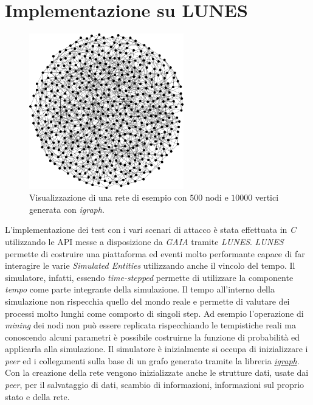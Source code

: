 \chapter{Implementazione su LUNES}

\begin{figure}[H]
    \centering
    \includegraphics[width=0.6\textwidth]{images/network-500.png}
    \caption{Visualizzazione di una rete di esempio con $500$ nodi e $10000$ vertici generata con \textit{igraph}.}
\end{figure}
L'implementazione dei test con i vari scenari di attacco è stata effettuata in \textit{C} utilizzando le API messe a disposizione da \textit{GAIA} tramite \textit{LUNES}.\newline
\textit{LUNES} permette di costruire una piattaforma ed eventi molto performante capace di far interagire le varie \textit{Simulated Entities} utilizzando anche il vincolo del tempo. Il simulatore, infatti, essendo \textit{time-stepped} permette di utilizzare la componente \textit{tempo} come parte integrante della simulazione. Il tempo all'interno della simulazione non rispecchia quello del mondo reale e permette di valutare dei processi molto lunghi come composto di singoli step. Ad esempio l'operazione di \textit{mining} dei nodi non può essere replicata rispecchiando le tempistiche reali ma conoscendo alcuni parametri è possibile costruirne la funzione di probabilità ed applicarla alla simulazione.\newline
Il simulatore è inizialmente si occupa di inizializzare i \textit{peer} ed i collegamenti sulla base di un grafo generato tramite la libreria \href{https://igraph.org/}{\textit{igraph}}. Con la creazione della rete vengono inizializzate anche le strutture dati, usate dai \textit{peer}, per il salvataggio di dati, scambio di informazioni, informazioni sul proprio stato e della rete.\newline
